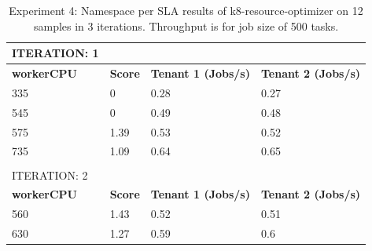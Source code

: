 \begin{table}[H]
\centering
\caption{Experiment 4: Namespace per SLA results of k8-resource-optimizer on 12 samples in 3 iterations. Throughput is for job size of 500 tasks.}
\label{tbl:results4}
\begin{tabular}{llll}
ITERATION: 1                             &                                     &                                                 &                                                 \\ \hline
\multicolumn{1}{|l|}{\textbf{workerCPU}} & \multicolumn{1}{l|}{\textbf{Score}} & \multicolumn{1}{l|}{\textbf{Tenant 1  (Jobs/s)}} & \multicolumn{1}{l|}{\textbf{Tenant 2  (Jobs/s)}} \\ \hline
\multicolumn{1}{|l|}{335}                & \multicolumn{1}{l|}{0}              & \multicolumn{1}{l|}{0.28}                       & \multicolumn{1}{l|}{0.27}                       \\ \hline
\multicolumn{1}{|l|}{545}                & \multicolumn{1}{l|}{0}              & \multicolumn{1}{l|}{0.49}                       & \multicolumn{1}{l|}{0.48}                       \\ \hline
\multicolumn{1}{|l|}{575}                & \multicolumn{1}{l|}{1.39}           & \multicolumn{1}{l|}{0.53}                       & \multicolumn{1}{l|}{0.52}                       \\ \hline
\multicolumn{1}{|l|}{735}                & \multicolumn{1}{l|}{1.09}           & \multicolumn{1}{l|}{0.64}                       & \multicolumn{1}{l|}{0.65}                       \\ \hline
                                         &                                     &                                                 &                                                 \\
ITERATION: 2                             &                                     &                                                 &                                                 \\ \hline
\multicolumn{1}{|l|}{\textbf{workerCPU}} & \multicolumn{1}{l|}{\textbf{Score}} & \multicolumn{1}{l|}{\textbf{Tenant 1 (Jobs/s)}}   & \multicolumn{1}{l|}{\textbf{Tenant 2 (Jobs/s)}}  \\ \hline
\multicolumn{1}{|l|}{560}                & \multicolumn{1}{l|}{1.43}           & \multicolumn{1}{l|}{0.52}                       & \multicolumn{1}{l|}{0.51}                       \\ \hline
\multicolumn{1}{|l|}{630}                & \multicolumn{1}{l|}{1.27}           & \multicolumn{1}{l|}{0.59}                       & \multicolumn{1}{l|}{0.6}                        \\ \hline

\end{tabular}
\end{table}
